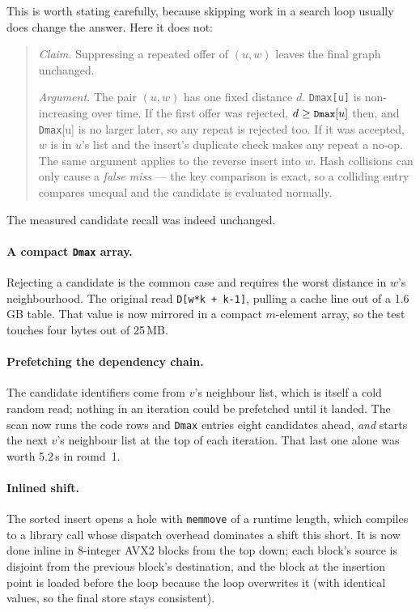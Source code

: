 \documentclass[11pt,a4paper]{article}
\newcommand{\code}[1]{\texttt{\small #1}}
\begin{document}
This is worth stating carefully, because skipping work in a search loop usually
does change the answer. Here it does not:

\begin{quote}
\emph{Claim.} Suppressing a repeated offer of $(u,w)$ leaves the final graph
unchanged.

\emph{Argument.} The pair $(u,w)$ has one fixed distance $d$. \code{Dmax[u]} is
non-increasing over time. If the first offer was rejected, $d \geq
\code{Dmax}[u]$ then, and \code{Dmax}[u] is no larger later, so any repeat is
rejected too. If it was accepted, $w$ is in $u$'s list and the insert's
duplicate check makes any repeat a no-op. The same argument applies to the
reverse insert into $w$. Hash collisions can only cause a \emph{false miss} ---
the key comparison is exact, so a colliding entry compares unequal and the
candidate is evaluated normally.
\end{quote}

\noindent
The measured candidate recall was indeed unchanged.

\paragraph{A compact \code{Dmax} array.} Rejecting a candidate is the common
case and requires the worst distance in $w$'s neighbourhood. The original read
\code{D[w*k + k-1]}, pulling a cache line out of a 1.6\,GB table. That value is
now mirrored in a compact $m$-element array, so the test touches four bytes out
of 25\,MB.

\paragraph{Prefetching the dependency chain.} The candidate identifiers come
from $v$'s neighbour list, which is itself a cold random read; nothing in an
iteration could be prefetched until it landed. The scan now runs the code rows
and \code{Dmax} entries eight candidates ahead, \emph{and} starts the next $v$'s
neighbour list at the top of each iteration. That last one alone was worth
5.2\,s in round~1.

\paragraph{Inlined shift.} The sorted insert opens a hole with \code{memmove}
of a runtime length, which compiles to a library call whose dispatch overhead
dominates a shift this short. It is now done inline in 8-integer AVX2 blocks
from the top down; each block's source is disjoint from the previous block's
destination, and the block at the insertion point is loaded before the loop
because the loop overwrites it (with identical values, so the final store stays
consistent).
\end{document}
